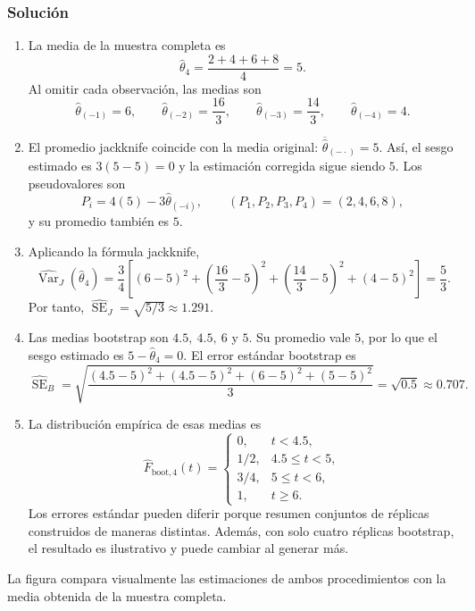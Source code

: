 \subsubsection*{Solución}

\begin{enumerate}
    \item La media de la muestra completa es
    \[
        \widehat\theta_4=\frac{2+4+6+8}{4}=5.
    \]
    Al omitir cada observación, las medias son
    \[
        \widehat\theta_{(-1)}=6,\qquad
        \widehat\theta_{(-2)}=\frac{16}{3},\qquad
        \widehat\theta_{(-3)}=\frac{14}{3},\qquad
        \widehat\theta_{(-4)}=4.
    \]

    \item El promedio jackknife coincide con la media original:
    $\overline{\widehat\theta}_{(-\cdot)}=5$. Así, el sesgo estimado es
    $3(5-5)=0$ y la estimación corregida sigue siendo $5$. Los pseudovalores
    son
    \[
        P_i=4(5)-3\widehat\theta_{(-i)},
        \qquad (P_1,P_2,P_3,P_4)=(2,4,6,8),
    \]
    y su promedio también es $5$.

    \item Aplicando la fórmula jackknife,
    \[
        \widehat{\operatorname{Var}}_J(\widehat\theta_4)
        =\frac{3}{4}\left[(6-5)^2+
          \left(\frac{16}{3}-5\right)^2+
          \left(\frac{14}{3}-5\right)^2+(4-5)^2\right]
        =\frac{5}{3}.
    \]
    Por tanto, $\widehat{\operatorname{SE}}_J=\sqrt{5/3}\approx1.291$.

    \item Las medias bootstrap son $4.5,\ 4.5,\ 6$ y $5$. Su promedio vale
    $5$, por lo que el sesgo estimado es $5-\widehat\theta_4=0$. El error
    estándar bootstrap es
    \[
        \widehat{\operatorname{SE}}_B
        =\sqrt{\frac{(4.5-5)^2+(4.5-5)^2+(6-5)^2+(5-5)^2}{3}}
        =\sqrt{0.5}\approx0.707.
    \]

    \item La distribución empírica de esas medias es
    \[
        \widehat F_{\mathrm{boot},4}(t)=
        \begin{cases}
            0, & t<4.5,\\
            1/2, & 4.5\leq t<5,\\
            3/4, & 5\leq t<6,\\
            1, & t\geq6.
        \end{cases}
    \]
    Los errores estándar pueden diferir porque resumen conjuntos de réplicas
    construidos de maneras distintas. Además, con solo cuatro réplicas
    bootstrap, el resultado es ilustrativo y puede cambiar al generar más.
\end{enumerate}
La figura compara visualmente las estimaciones de ambos procedimientos con la
media obtenida de la muestra completa.

